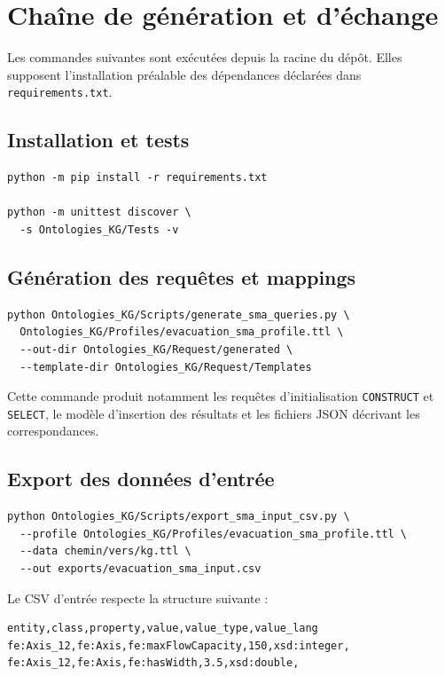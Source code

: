 \documentclass{article}
\begin{document}
\clearpage
\section{Chaîne de génération et d'échange}

Les commandes suivantes sont exécutées depuis la racine du dépôt. Elles supposent l'installation préalable des dépendances déclarées dans \texttt{requirements.txt}.

\subsection{Installation et tests}

\begin{lstlisting}
python -m pip install -r requirements.txt

python -m unittest discover \
  -s Ontologies_KG/Tests -v
\end{lstlisting}

\subsection{Génération des requêtes et mappings}

\begin{lstlisting}
python Ontologies_KG/Scripts/generate_sma_queries.py \
  Ontologies_KG/Profiles/evacuation_sma_profile.ttl \
  --out-dir Ontologies_KG/Request/generated \
  --template-dir Ontologies_KG/Request/Templates
\end{lstlisting}

Cette commande produit notamment les requêtes d'initialisation \texttt{CONSTRUCT} et \texttt{SELECT}, le modèle d'insertion des résultats et les fichiers JSON décrivant les correspondances.

\subsection{Export des données d'entrée}

\begin{lstlisting}
python Ontologies_KG/Scripts/export_sma_input_csv.py \
  --profile Ontologies_KG/Profiles/evacuation_sma_profile.ttl \
  --data chemin/vers/kg.ttl \
  --out exports/evacuation_sma_input.csv
\end{lstlisting}

Le CSV d'entrée respecte la structure suivante :

\begin{lstlisting}
entity,class,property,value,value_type,value_lang
fe:Axis_12,fe:Axis,fe:maxFlowCapacity,150,xsd:integer,
fe:Axis_12,fe:Axis,fe:hasWidth,3.5,xsd:double,
\end{lstlisting}
\end{document}
